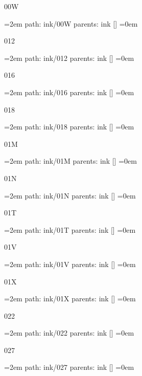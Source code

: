 \smallskip
\vfill \break
{}
00W
\smallskip
\par\begingroup
\leftskip=2em
path: ink/00W
\smallskip
parents:  ink []
\smallskip
\leftskip=0em
\par\endgroup
\bigskip
{}
012
\smallskip
\par\begingroup
\leftskip=2em
path: ink/012
\smallskip
parents:  ink []
\smallskip
\leftskip=0em
\par\endgroup
\bigskip
{}
016
\smallskip
\par\begingroup
\leftskip=2em
path: ink/016
\smallskip
parents:  ink []
\smallskip
\leftskip=0em
\par\endgroup
\bigskip
{}
018
\smallskip
\par\begingroup
\leftskip=2em
path: ink/018
\smallskip
parents:  ink []
\smallskip
\leftskip=0em
\par\endgroup
\bigskip
{}
01M
\smallskip
\par\begingroup
\leftskip=2em
path: ink/01M
\smallskip
parents:  ink []
\smallskip
\leftskip=0em
\par\endgroup
\bigskip
{}
01N
\smallskip
\par\begingroup
\leftskip=2em
path: ink/01N
\smallskip
parents:  ink []
\smallskip
\leftskip=0em
\par\endgroup
\bigskip
{}
01T
\smallskip
\par\begingroup
\leftskip=2em
path: ink/01T
\smallskip
parents:  ink []
\smallskip
\leftskip=0em
\par\endgroup
\bigskip
{}
01V
\smallskip
\par\begingroup
\leftskip=2em
path: ink/01V
\smallskip
parents:  ink []
\smallskip
\leftskip=0em
\par\endgroup
\bigskip
{}
01X
\smallskip
\par\begingroup
\leftskip=2em
path: ink/01X
\smallskip
parents:  ink []
\smallskip
\leftskip=0em
\par\endgroup
\bigskip
{}
022
\smallskip
\par\begingroup
\leftskip=2em
path: ink/022
\smallskip
parents:  ink []
\smallskip
\leftskip=0em
\par\endgroup
\bigskip
{}
027
\smallskip
\par\begingroup
\leftskip=2em
path: ink/027
\smallskip
parents:  ink []
\smallskip
\leftskip=0em
\par\endgroup
